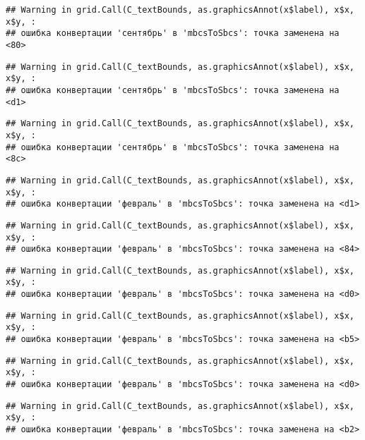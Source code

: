 \documentclass[
]{article}
\begin{document}
\begin{verbatim}
## Warning in grid.Call(C_textBounds, as.graphicsAnnot(x$label), x$x, x$y, :
## ошибка конвертации 'сентябрь' в 'mbcsToSbcs': точка заменена на <80>
\end{verbatim}

\begin{verbatim}
## Warning in grid.Call(C_textBounds, as.graphicsAnnot(x$label), x$x, x$y, :
## ошибка конвертации 'сентябрь' в 'mbcsToSbcs': точка заменена на <d1>
\end{verbatim}

\begin{verbatim}
## Warning in grid.Call(C_textBounds, as.graphicsAnnot(x$label), x$x, x$y, :
## ошибка конвертации 'сентябрь' в 'mbcsToSbcs': точка заменена на <8c>
\end{verbatim}

\begin{verbatim}
## Warning in grid.Call(C_textBounds, as.graphicsAnnot(x$label), x$x, x$y, :
## ошибка конвертации 'февраль' в 'mbcsToSbcs': точка заменена на <d1>
\end{verbatim}

\begin{verbatim}
## Warning in grid.Call(C_textBounds, as.graphicsAnnot(x$label), x$x, x$y, :
## ошибка конвертации 'февраль' в 'mbcsToSbcs': точка заменена на <84>
\end{verbatim}

\begin{verbatim}
## Warning in grid.Call(C_textBounds, as.graphicsAnnot(x$label), x$x, x$y, :
## ошибка конвертации 'февраль' в 'mbcsToSbcs': точка заменена на <d0>
\end{verbatim}

\begin{verbatim}
## Warning in grid.Call(C_textBounds, as.graphicsAnnot(x$label), x$x, x$y, :
## ошибка конвертации 'февраль' в 'mbcsToSbcs': точка заменена на <b5>
\end{verbatim}

\begin{verbatim}
## Warning in grid.Call(C_textBounds, as.graphicsAnnot(x$label), x$x, x$y, :
## ошибка конвертации 'февраль' в 'mbcsToSbcs': точка заменена на <d0>
\end{verbatim}

\begin{verbatim}
## Warning in grid.Call(C_textBounds, as.graphicsAnnot(x$label), x$x, x$y, :
## ошибка конвертации 'февраль' в 'mbcsToSbcs': точка заменена на <b2>
\end{verbatim}
\end{document}
